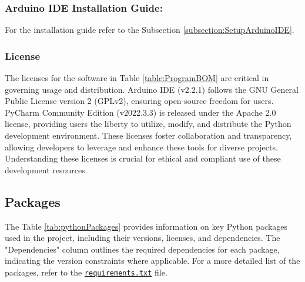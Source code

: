 \subsubsection{Arduino IDE Installation Guide:}

For the installation guide refer to the Subsection \ref{subsection:SetupArduinoIDE}.


\subsubsection{License}

The licenses for the software in Table \ref{table:ProgramBOM} are critical in governing usage and distribution. Arduino IDE (v2.2.1) follows the GNU General Public License version 2 (GPLv2), ensuring open-source freedom for users. PyCharm Community Edition (v2022.3.3) is released under the Apache 2.0 license, providing users the liberty to utilize, modify, and distribute the Python development environment. These licenses foster collaboration and transparency, allowing developers to leverage and enhance these tools for diverse projects. Understanding these licenses is crucial for ethical and compliant use of these development resources.


\subsection{Packages}

The Table \ref{tab:pythonPackages} provides information on key Python packages used in the project, including their versions, licenses, and dependencies. The "Dependencies" column outlines the required dependencies for each package, indicating the version constraints where applicable. For a more detailed list of the packages, refer to the \href{run:../Code/KeywordSpotting/envRequirements/requirements.txt}{\texttt{requirements.txt}} file.


